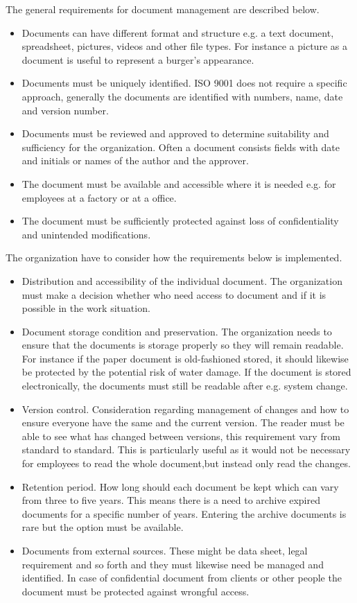 The general requirements for document management are described below.
\begin{itemize}
	\item Documents can have different format and structure e.g. a text document, spreadsheet, pictures, videos and other file types. For instance a picture as a document is useful to represent a burger's appearance. 
	\item Documents must be uniquely identified. ISO 9001 does not require a specific approach, generally the documents are identified with numbers, name, date and version number. 
	\item Documents must be reviewed and approved to determine suitability and sufficiency for the organization. Often a document consists fields with date and initials or names of the author and  the approver.
	\item The document must be available and accessible where it is needed e.g. for employees at a factory or at a office. 
	\item The document must be sufficiently protected against loss of confidentiality and unintended modifications. 
\end{itemize}

The organization have to consider how  the requirements below is implemented. 

\begin{itemize}
	\item Distribution and accessibility of the individual document. The organization must make a decision whether who need access to document and if it is possible in the work situation. 
	\item Document storage condition and preservation. The organization needs to ensure that the documents is storage properly so they will remain readable. For instance if the paper document is old-fashioned stored, it should likewise be protected by the potential risk of water damage. If the document is stored electronically, the documents must still be readable after e.g. system change. 
	\item Version control. Consideration regarding management of changes and how to ensure everyone have the same and the current version. The reader must be able to see what has changed between versions, this requirement vary from standard to standard. This is particularly useful as it would not be necessary for employees to read the whole document,but  instead only read the changes. 
	\item Retention period. How long should each document be kept which can vary from three to five years. This means there is a need to archive expired documents for a specific number of years.  Entering the archive documents is rare but the option must be available. 
	\item Documents from external sources. These might be data sheet, legal requirement and so forth and they must likewise need be managed and identified. In case of confidential document from clients or other people the document must be protected against wrongful access. 
\end{itemize}

